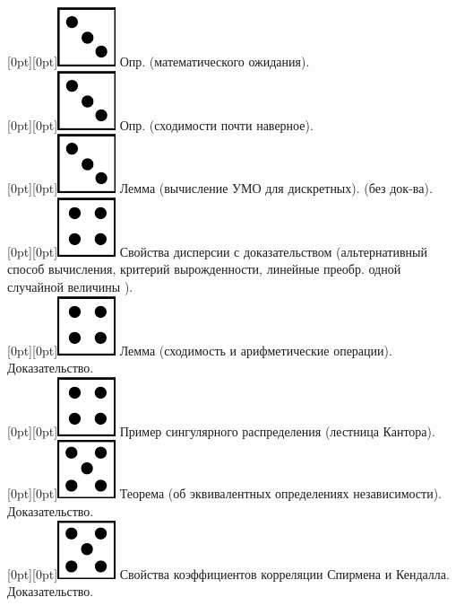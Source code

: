 \documentclass[10pt]{article}
\begin{document}
\raisebox{-1pt}[0pt][0pt]{\includegraphics[width=0.02\linewidth]{3.png}} Опр. (математического ожидания). \\

\raisebox{-1pt}[0pt][0pt]{\includegraphics[width=0.02\linewidth]{3.png}} Опр. (сходимости почти наверное). \\

\raisebox{-1pt}[0pt][0pt]{\includegraphics[width=0.02\linewidth]{3.png}} Лемма (вычисление УМО для дискретных). (без док-ва). \\

\raisebox{-1pt}[0pt][0pt]{\includegraphics[width=0.02\linewidth]{4.png}} Свойства дисперсии с доказательством (альтернативный способ вычисления, критерий вырожденности, линейные преобр. одной случайной величины ). \\ 

\raisebox{-1pt}[0pt][0pt]{\includegraphics[width=0.02\linewidth]{4.png}} Лемма (сходимость и арифметические операции). Доказательство. \\

\raisebox{-1pt}[0pt][0pt]{\includegraphics[width=0.02\linewidth]{4.png}}   Пример сингулярного распределения (лестница Кантора). \\

\raisebox{-1pt}[0pt][0pt]{\includegraphics[width=0.02\linewidth]{5.png}} Теорема (об эквивалентных определениях независимости). Доказательство. \\

\raisebox{-1pt}[0pt][0pt]{\includegraphics[width=0.02\linewidth]{5.png}} Свойства коэффициентов корреляции Спирмена и Кендалла. Доказательство. \\ 
\end{document}
